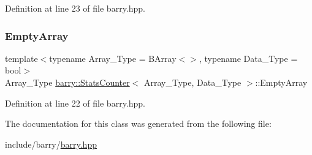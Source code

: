 Definition at line 23 of file barry.\+hpp.

\mbox{\label{classbarry_1_1_stats_counter_ad78463fadfa385a69121c40fdc8fd193}} 
\subsubsection{\texorpdfstring{Empty\+Array}{EmptyArray}}
{\footnotesize\ttfamily template$<$typename Array\+\_\+\+Type = B\+Array$<$$>$, typename Data\+\_\+\+Type = bool$>$ \\
Array\+\_\+\+Type \hyperlink{classbarry_1_1_stats_counter}{barry\+::\+Stats\+Counter}$<$ Array\+\_\+\+Type, Data\+\_\+\+Type $>$\+::Empty\+Array}



Definition at line 22 of file barry.\+hpp.



The documentation for this class was generated from the following file\+:\begin{DoxyCompactItemize}
\item 
include/barry/\hyperlink{barry_8hpp}{barry.\+hpp}\end{DoxyCompactItemize}
